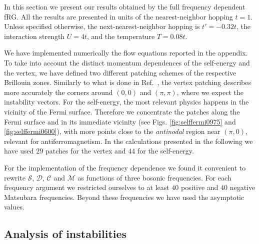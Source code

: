 In this section we present our results obtained by the full frequency dependent fRG. All the results are presented in units of the nearest-neighbor hopping $t=1$. Unless specified otherwise, the next-nearest-neighbor hopping is $t'=-0.32t$, the interaction strength $U=4t$, and the temperature $T=0.08t$.

We have implemented numerically the flow equations reported in the appendix. 
To take into account the distinct momentum dependences of the self-energy and the vertex, we have defined two different patching schemes of the respective Brillouin zones. 
Similarly to what is done in Ref.~, the vertex patching describes more accurately the corners around $(0,0)$ and $(\pi,\pi)$, where we expect the instability vectors.
For the self-energy, the most relevant physics happens in the vicinity of the Fermi surface.
Therefore we concentrate the patches along the Fermi surface and in its immediate vicinity (see Figs. \ref{fig:selffermi0975} and \ref{fig:selffermi0600}), with more points close to the \textit{antinodal} region near $(\pi,0)$, relevant for antiferromagnetism.
In the calculations presented in the following we have used $29$ patches for the vertex and $44$ for the self-energy.

For the implementation of the frequency dependence we found it convenient to rewrite $\mathcal{S}$, $\mathcal{D}$, $\mathcal{C}$ and $\mathcal{M}$ as functions of three bosonic frequencies. 
For each frequency argument we restricted ourselves to at least $40$ positive and $40$ negative Matsubara frequencies. Beyond these frequencies we have used the asymptotic values. 

\subsection{Analysis of instabilities}

